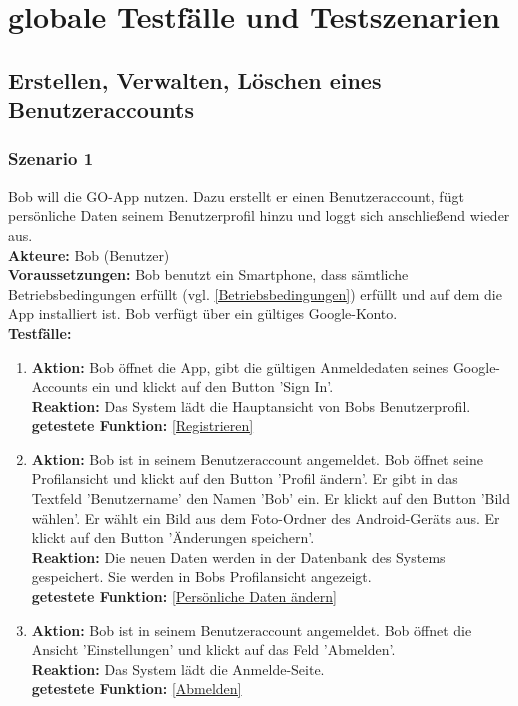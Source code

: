 \documentclass[parskip=full]{scrartcl}
\def\threedigits#1{%
  \ifnum#1<100 0\fi
  \ifnum#1<10 0\fi
  \number#1}
\begin{document}

\newpage
\section{globale Testfälle und Testszenarien}

\subsection{Erstellen, Verwalten, Löschen eines Benutzeraccounts}

\subsubsection*{Szenario 1}Bob will die GO-App nutzen. Dazu erstellt er einen Benutzeraccount, fügt persönliche Daten seinem Benutzerprofil hinzu und loggt sich anschließend wieder aus.\\

\textbf{Akteure:} Bob (Benutzer) \\

\textbf{Voraussetzungen: }Bob benutzt ein Smartphone, dass sämtliche Betriebsbedingungen erfüllt (vgl. \ref{Betriebsbedingungen}) erfüllt und auf dem die App installiert ist. Bob verfügt über ein gültiges Google-Konto.\\

\textbf{Testfälle:}
\begin{enumerate}[label={\textbf{/T\protect\threedigits{\theenumi}0/}}, leftmargin=*]
	\item\label{Registrieren-Test} \textbf{Aktion:} Bob öffnet die App, gibt die gültigen Anmeldedaten seines Google-Accounts ein und klickt auf den Button 'Sign In'. \\
									\textbf{Reaktion:} Das System lädt die Hauptansicht von Bobs Benutzerprofil.\\
									\textbf{getestete Funktion: }\ref{Registrieren}
	\item \textbf{Aktion:} Bob ist in seinem Benutzeraccount angemeldet. Bob öffnet seine Profilansicht und klickt auf den Button 'Profil ändern'. Er gibt in das Textfeld 'Benutzername' den Namen 'Bob' ein. Er klickt auf den Button 'Bild wählen'. Er wählt ein Bild aus dem Foto-Ordner des Android-Geräts aus. Er klickt auf den Button 'Änderungen speichern'. \\
		  \textbf{Reaktion:} Die neuen Daten werden in der Datenbank des Systems gespeichert. Sie werden in Bobs Profilansicht angezeigt.\\
		  \textbf{getestete Funktion: }\ref{Persönliche Daten ändern}
	\item \textbf{Aktion:} Bob ist in seinem Benutzeraccount angemeldet. Bob öffnet die Ansicht 'Einstellungen' und klickt auf das Feld 'Abmelden'.\\
		  \textbf{Reaktion:} Das System lädt die Anmelde-Seite.\\
		  \textbf{getestete Funktion: }\ref{Abmelden}
\end{enumerate}
\end{document}
